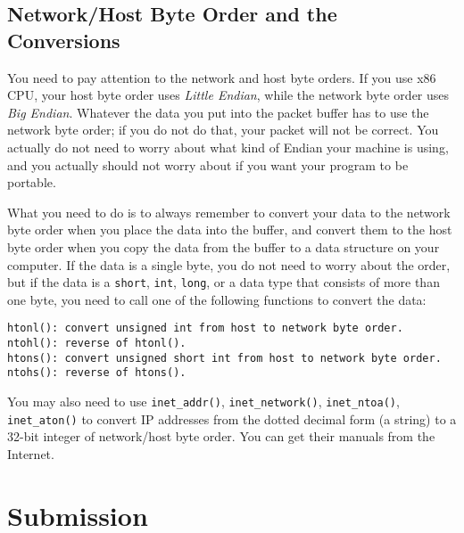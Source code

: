 \subsection{Network/Host Byte Order and the Conversions}


You need to pay attention to the network and host byte orders. If you use 
x86 CPU, your host byte order uses {\em Little Endian}, while 
the network byte order uses {\em Big Endian}. Whatever the data you put 
into the packet buffer has to use the network byte order; if you do not 
do that, your packet will not be correct. You actually do not need to worry
about what kind of Endian your machine is using, and you actually should not worry
about if you want your program to be portable. 


What you need to do is to always remember to convert your data to the
network byte order when you place the data into the buffer, and convert
them to the host byte order when you copy the data from the buffer to 
a data structure on your computer. If the data is a single byte, you do not
need to worry about the order, but if the data is a {\tt short}, 
{\tt int}, {\tt long}, or a data type that consists of more than one byte, 
you need to call one of the following functions to convert the data:

\begin{lstlisting}
htonl(): convert unsigned int from host to network byte order.
ntohl(): reverse of htonl().
htons(): convert unsigned short int from host to network byte order.
ntohs(): reverse of htons().
\end{lstlisting}


You may also need to use {\tt inet\_addr()}, {\tt inet\_network()},
{\tt inet\_ntoa()}, {\tt inet\_aton()} to convert 
IP addresses from the dotted decimal form (a string) to a
32-bit integer of network/host byte order. You can get their 
manuals from the Internet.


 

\section{Submission}








